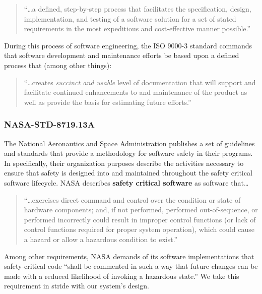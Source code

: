 \begin{quote}
``\ldots a defined, step-by-step process that facilitates the specification,
design, implementation, and testing of a software solution for a set of stated
requirements in the most expeditious and cost-effective manner possible.''
\cite{Kehoe1996}
\end{quote}

During this process of software engineering, the ISO 9000-3 standard commands
that software development and maintenance efforts be based upon a defined
process that (among other things): 

\begin{quote}
``\ldots creates \textit{succinct and usable} level of documentation that will
support and facilitate continued enhancements to and maintenance of the product
as well as provide the basis for estimating future efforts.'' \cite{Kehoe1996}
\end{quote}

\subsubsection{NASA-STD-8719.13A}
The National Aeronautics and Space Administration publishes a set of guidelines
and standards that provide a methodology for software safety in their programs.
In \cite{NASA1997} specifically, their organization purposes describe the
activities necessary to ensure that safety is designed into and maintained
throughout the safety critical software lifecycle. NASA describes \textbf{safety
critical software} as software that\ldots

\begin{quote} 
``\ldots exercises direct command and control over the condition or state of
hardware components; and, if not performed, performed out-of-sequence, or
performed incorrectly could result in improper control functions (or lack of
control functions required for proper system operation), which could cause a
hazard or allow a hazardous condition to exist.'' \cite{NASA1997}
\end{quote}

Among other requirements, NASA demands of its software implementations that
safety-critical code ``shall be commented in such a way that future changes can
be made with a reduced likelihood of invoking a hazardous state.'' We take this
requirement in stride with our system's design.

